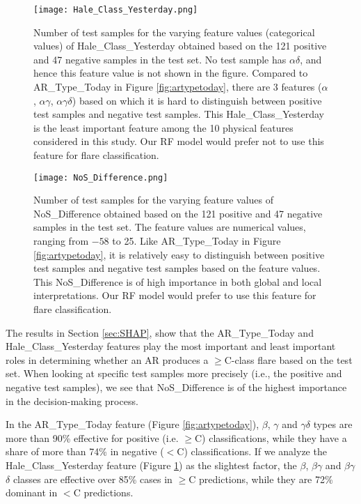 \documentclass[draft]{agujournal2019}
\begin{document}
\begin{figure}
\centering
\hspace*{-0.7cm}
\texttt{[image: Hale\_Class\_Yesterday.png]}
\caption{Number of test samples for the varying feature values (categorical values) of Hale\_Class\_Yesterday obtained based on the 121 positive and 47 negative samples in the test set. No test sample has $\alpha$$\delta$, and hence this feature value is not shown in the figure. Compared to AR\_Type\_Today in Figure \ref{fig:artypetoday}, there are 3 features ($\alpha$, $\alpha$$\gamma$, $\alpha$$\gamma$$\delta$) based on which it is hard to distinguish between positive test samples and negative test samples. 
This Hale\_Class\_Yesterday is the least important feature among the 10 physical features considered in this study. Our RF model would prefer not to use this feature for flare classification.}
\label{fig:haleclassyesterday}
\end{figure}

\begin{figure}
\centering
\hspace*{-0.7cm}
\texttt{[image: NoS\_Difference.png]}
\caption{Number of test samples for the varying feature values of NoS\_Difference obtained based on the 121 positive and 47 negative samples in the test set. The feature values are numerical values, ranging from $-58$ to 25. Like AR\_Type\_Today in Figure \ref{fig:artypetoday}, it is relatively easy to distinguish between positive test samples and negative test samples based on the feature values. This NoS\_Difference is of high importance in both global and local interpretations. Our RF model would prefer to use this feature for flare classification.}
\label{fig:nosdifference}
\end{figure}

The results in Section \ref{sec:SHAP}, show that the AR\_Type\_Today and Hale\_Class\_Yesterday features play the most important and least important roles in determining whether an AR produces a $\geq$C-class flare based on the test set. When looking at specific test samples more precisely
(i.e., the positive and negative test samples), we see that 
NoS\_Difference is of the highest importance in the decision-making process.

In the AR\_Type\_Today feature (Figure \ref{fig:artypetoday}), $\beta$, $\gamma$ and $\gamma$$\delta$ types are more than 90\% effective for positive (i.e. $\geq$C) classifications, while they have a share of more than 74\% in negative ($<$C) classifications.  If we analyze the Hale\_Class\_Yesterday feature (Figure \ref{fig:haleclassyesterday}) as the slightest factor, the $\beta$, $\beta$$\gamma$ and $\beta$$\gamma$$\delta$ classes are effective over 85\% cases in $\geq$C predictions, while they are 72\% dominant in $<$C predictions. 
\end{document}
